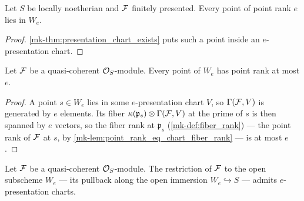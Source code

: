 \begin{lemma}
  \label{mk-lem:chart_locus_contains_rank_locus}
  \leanok

  Let \(S\) be locally noetherian and \(\mathcal{F}\) finitely presented.  Every
  point of point rank \(e\) lies in \(W_e\).
\end{lemma}

\begin{proof}
  \leanok
  \ref{mk-thm:presentation_chart_exists} puts such a point inside an
  \(e\)-presentation chart.
\end{proof}

\begin{lemma}
  \label{mk-lem:chart_locus_rank_bound}
  \leanok

  Let \(\mathcal{F}\) be a quasi-coherent \(\mathcal{O}_S\)-module.  Every point of \(W_e\)
  has point rank at most \(e\).
\end{lemma}

\begin{proof}
  \leanok
  A point \(s \in W_e\) lies in some \(e\)-presentation chart \(V\), so
  \(\Gamma(\mathcal{F}, V)\) is generated by \(e\) elements.  Its fiber
  \(\kappa(\mathfrak p_s) \otimes \Gamma(\mathcal{F}, V)\) at the prime of \(s\) is
  then spanned by \(e\) vectors, so the fiber rank at \(\mathfrak p_s\)
  (\ref{mk-def:fiber_rank}) --- the point rank of \(\mathcal{F}\) at \(s\), by
  \ref{mk-lem:point_rank_eq_chart_fiber_rank} --- is at most \(e\).
\end{proof}

\begin{lemma}
  \label{mk-lem:charts_cover_chart_locus}
  \leanok

  Let \(\mathcal{F}\) be a quasi-coherent \(\mathcal{O}_S\)-module.  The restriction of
  \(\mathcal{F}\) to the open subscheme \(W_e\) --- its pullback along the open
  immersion \(W_e \hookrightarrow S\) --- admits \(e\)-presentation charts.
\end{lemma}

